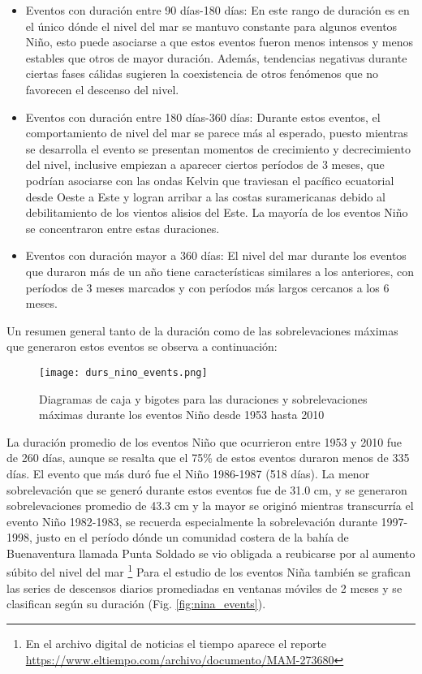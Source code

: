\begin{itemize}
	\item Eventos con duración entre 90 días-180 días: En este rango de duración es en el único dónde el nivel del mar se mantuvo constante para algunos eventos Niño, esto puede asociarse a que estos eventos fueron menos intensos y menos estables que otros de mayor duración. Además, tendencias negativas durante ciertas fases cálidas sugieren la coexistencia de otros fenómenos que no favorecen el descenso del nivel.
	
	\item Eventos con duración entre 180 días-360 días: Durante estos eventos, el comportamiento de nivel del mar se parece más al esperado, puesto mientras se desarrolla el evento se presentan momentos de crecimiento y decrecimiento del nivel, inclusive empiezan a aparecer ciertos períodos de 3 meses, que podrían asociarse con las ondas Kelvin que traviesan el pacífico ecuatorial desde Oeste a Este y logran arribar a las costas suramericanas debido al debilitamiento de los vientos alisios del Este. La mayoría de los eventos Niño se concentraron entre estas duraciones.
	
	\item Eventos con duración mayor a 360 días: El nivel del mar durante los eventos que duraron más de un año tiene características similares a los anteriores, con períodos de 3 meses marcados y con períodos más largos cercanos a los 6 meses.
	
\end{itemize}

Un resumen general tanto de la duración como de las sobrelevaciones máximas que generaron estos eventos se observa a continuación:

\begin{figure}[h]
	\centering
	\texttt{[image: durs\_nino\_events.png]}
	\caption{Diagramas de caja y bigotes para las duraciones y sobrelevaciones máximas durante los eventos Niño desde 1953 hasta 2010}
	\label{fig:durs_nino}
\end{figure}

La duración promedio de los eventos Niño que ocurrieron entre 1953 y 2010 fue de 260 días, aunque se resalta que el 75\% de estos eventos duraron menos de 335 días. El evento que más duró fue el Niño 1986-1987 (518 días). La menor sobrelevación que se generó durante estos eventos fue de 31.0 cm, y se generaron sobrelevaciones promedio de 43.3 cm y la mayor se originó mientras transcurría el evento Niño 1982-1983, se recuerda especialmente la sobrelevación durante 1997-1998, justo en el período dónde un comunidad costera de la bahía de Buenaventura llamada Punta Soldado se vio obligada a reubicarse por al aumento súbito del nivel del mar \footnote{En el archivo digital de noticias el tiempo aparece el reporte \url{https://www.eltiempo.com/archivo/documento/MAM-273680}}
%
Para el estudio de los eventos Niña también se grafican las series de descensos diarios promediadas en ventanas móviles de 2 meses y se clasifican según su duración (Fig. \ref{fig:nina_events}).

